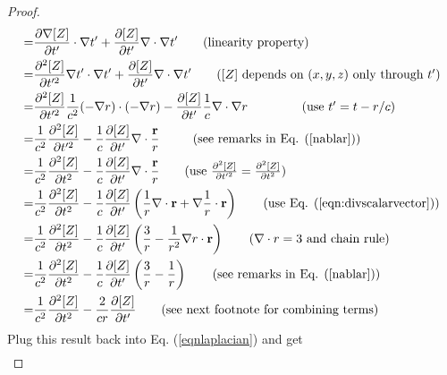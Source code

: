 \documentclass[11pt]{article}              %
\begin{document}
\begin{proof}
\begin{align}
    =&\frac{\partial {\nabla [Z]}}{\partial t^\prime}\cdot\nabla t^\prime+\frac{\partial [Z]}{\partial t^\prime}\nabla\cdot\nabla t^\prime\tag{linearity property}\\
    =&\frac{\partial^2 [Z]}{\partial t^{\prime 2}}\nabla t^\prime\cdot\nabla t^\prime+\frac{\partial [Z]}{\partial t^\prime}\nabla\cdot\nabla t^\prime\tag{$[Z]$ depends on $(x,y,z)$ only through $t^\prime$}\\
    =&\frac{\partial^2 [Z]}{\partial t^{\prime 2}}\frac{1}{c^2}(-\nabla r)\cdot(-\nabla r)-\frac{\partial [Z]}{\partial t^\prime}\frac{1}{c}\nabla\cdot\nabla r\ \ \ \ \ \ \ \ \ \ \ \ \ \mbox{(use $t^\prime=t-r/c$)}\notag\\
    =&\frac{1}{c^2}\frac{\partial^2 [Z]}{\partial t^{\prime 2}}-\frac{1}{c}\frac{\partial [Z]}{\partial t^\prime}\nabla \cdot \frac{\mathbf r}{r}\ \ \ \ \ \ \ \ \mbox{(see remarks in Eq. (\ref{nablar}))}\\
    =&\frac{1}{c^2}\frac{\partial^2 [Z]}{\partial t^2}-\frac{1}{c}\frac{\partial [Z]}{\partial t^\prime}\nabla \cdot \frac{\mathbf r}{r} \tag{use $\frac{\partial^2 [Z]}{\partial t^{\prime 2}}=\frac{\partial^2 [Z]}{\partial t^2}$}\\
    =&\frac{1}{c^2}\frac{\partial^2 [Z]}{\partial t^2}-\frac{1}{c}\frac{\partial [Z]}{\partial t^\prime}\left(\frac{1}{r}\nabla\cdot{\mathbf r}+\nabla \frac{1}{r}\cdot{\mathbf r}\right)\tag{use Eq. (\ref{eqn:divscalarvector})}\\
    =&\frac{1}{c^2}\frac{\partial^2 [Z]}{\partial t^2}-\frac{1}{c}\frac{\partial [Z]}{\partial t^\prime}\left(\frac{3}{r}-\frac{1}{r^2}\nabla r\cdot{\mathbf r}\right)\tag{$\nabla\cdot r=3$ and chain rule}\\
    =&\frac{1}{c^2}\frac{\partial^2 [Z]}{\partial t^2}-\frac{1}{c}\frac{\partial [Z]}{\partial t^\prime}\left(\frac{3}{r}-\frac{1}{r}\right)\tag{see remarks in Eq. (\ref{nablar})}\\
    =&\frac{1}{c^2}\frac{\partial^2 [Z]}{\partial t^2}-\frac{2}{cr}\frac{\partial [Z]}{\partial t^\prime}\tag{see next footnote for combining terms}
\end{align}
Plug this result back into Eq. (\ref{eqnlaplacian}) and get
\begin{align}

\end{align}
\end{proof}
\end{document}

